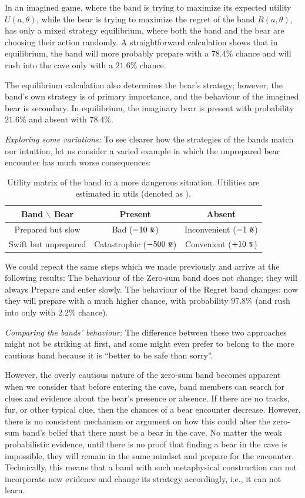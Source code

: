 \documentclass{article}
\newcommand{\util}{\scalebox{0.75}{\text{\Pfund}}}
\begin{document}
In an imagined game, where the band is trying to maximize its expected utility $U(a,\theta)$, while the bear is trying to maximize the regret of the band $R(a,\theta)$, has only a mixed strategy equilibrium, where both the band and the bear are choosing their action randomly.
A straightforward calculation shows that in equilibrium, the band will more probably prepare with a $78.4\%$ chance and will rush into the cave only with a $21.6\%$ chance.

The equilibrium calculation also determines the bear's strategy; however, the band's own strategy is of primary importance, and the behaviour of the imagined bear is secondary.
In equilibrium, the imaginary bear is present with probability $21.6\%$ and absent with $78.4\%$.

{\it Exploring some variations:}
To see clearer how the strategies of the bands match our intuition, let us consider a varied example in which the unprepared bear encounter has much worse consequences:


\begin{table}[h!]
    \centering
    \begin{tabular}{c|cc}
        Band $\backslash$ Bear & Present & Absent \\
        \hline
        Prepared but slow & Bad ($-10\ \util$) & Inconvenient ($-1\ \util$) \\
        Swift but unprepared & Catastrophic ($-500\ \util$) & Convenient ($+10\ \util$) \\
    \end{tabular}
    \caption{Utility matrix of the band in a more dangerous situation. Utilities are estimated in utils (denoted as \util).}
    \label{tab:BandBearUtilityMatrix2}
\end{table}

We could repeat the same steps which we made previously and arrive at the following results:
The behaviour of the Zero-sum band does not change; they will always Prepare and enter slowly.
The behaviour of the Regret band changes: now they will prepare with a much higher chance, with probability $97.8\%$ (and rush into only with $2.2\%$ chance).

{\it Comparing the bands' behaviour:}
The difference between these two approaches might not be striking at first, and some might even prefer to belong to the more cautious band because it is ``better to be safe than sorry''.

However, the overly cautious nature of the zero-sum band becomes apparent when we consider that before entering the cave, band members can search for clues and evidence about the bear's presence or absence.
If there are no tracks, fur, or other typical clue, then the chances of a bear encounter decrease.
However, there is no consistent mechanism or argument on how this could alter the zero-sum band’s belief that there must be a bear in the cave.
No matter the weak probabilistic evidence, until there is no proof that finding a bear in the cave is impossible, they will remain in the same mindset and prepare for the encounter.
Technically, this means that a band with such metaphysical construction can not incorporate new evidence and change its strategy accordingly, i.e., it can not learn.
\end{document}
